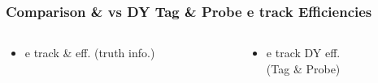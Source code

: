 \documentclass{beamer}
\begin{document}
\begin{frame}
 \frametitle{Comparison \ttbar \& \wpj vs DY Tag \& Probe e track Efficiencies}
   \begin{columns}

   \begin{column}{0.33\textwidth}
     \begin{itemize}
   \item e track \ttbar \& \wpj eff. (truth info.)
  \end{itemize}
   \end{column}
   \begin{column}{0.33\textwidth}
   \begin{itemize}
    \item e track DY eff. \\(Tag \& Probe)
   \end{itemize}


\end{column}
\end{columns}
\end{frame}
\end{document}
